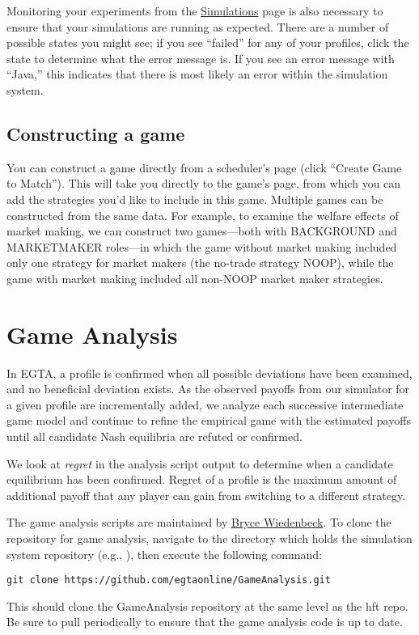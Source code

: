 \documentclass[11pt]{article}
\begin{document}
Monitoring your experiments from the \href{http://egtaonline.eecs.umich.edu/simulations}{Simulations} page is also necessary to ensure that your simulations are running as expected.
There are a number of possible states you might see; if you see ``failed'' for any of your profiles, click the state to determine what the error message is. If you see an error message with ``Java,'' this indicates that there is most likely an error within the simulation system.

\subsection{Constructing a game}

You can construct a game directly from a scheduler's page (click ``Create Game to Match''). This will take you directly to the game's page, from which you can add the strategies you'd like to include in this game.
Multiple games can be constructed from the same data.
For example, to examine the welfare effects of market making, we can construct two games---both with BACKGROUND and MARKETMAKER roles---in which the game without market making included only one strategy for market makers (the no-trade strategy NOOP), while the game with market making included all non-NOOP market maker strategies.


\section{Game Analysis}\label{sec:analysis}

In EGTA, a profile is confirmed when all possible deviations have been examined, and no beneficial deviation exists.
As the observed payoffs from our simulator for a given profile are incrementally added, we analyze each successive intermediate game model and continue to refine the empirical game with the estimated payoffs until all candidate Nash equilibria are refuted or confirmed.

We look at \emph{regret} in the analysis script output to determine when a candidate equilibrium has been confirmed. Regret of a profile is the maximum amount of additional payoff that any player can gain from switching to a different strategy.

The game analysis scripts are maintained by \href{mailto:btwied@umich.edu}{Bryce Wiedenbeck}. To clone the repository for game analysis, navigate to the directory which holds the simulation system repository (e.g., ), then execute the following command:
\begin{verbatim}
git clone https://github.com/egtaonline/GameAnalysis.git
\end{verbatim}
This should clone the GameAnalysis repository at the same level as the hft repo.
Be sure to pull periodically to ensure that the game analysis code is up to date.
\end{document}
